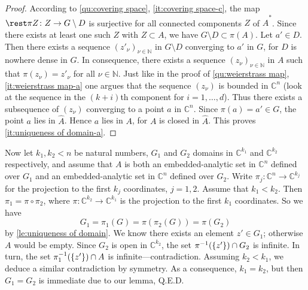 \documentclass[a4paper]{amsart}
\newcommand{\N}{\mathbb{N}}
\newcommand{\C}{\mathbb{C}}
\theoremstyle{remark}
\numberwithin{equation}{question}
\DeclarePairedDelimiter\set{\{}{\}}
\begin{document}
\begin{solution}
\begin{proof}
According to \cref{qu:covering space}, \cref{it:covering space-c}, the map $\rest\pi Z \colon Z \to G \setminus D$ is surjective for all connected components $Z$ of $\hat A^*$. Since there exists at least one such $Z$ with $Z \subset A$, we have $G \setminus D \subset \pi(A)$. Let $a' \in D$. Then there exists a sequence $(z'_\nu)_{\nu \in \N}$ in $G \setminus D$ converging to $a'$ in $G$, for $D$ is nowhere dense in $G$. In consequence, there exists a sequence $(z_\nu)_{\nu \in \N}$ in $A$ such that $\pi(z_\nu) = z'_\nu$ for all $\nu \in \N$. Just like in the proof of \cref{qu:weierstrass map}, \cref{it:weierstrass map-a} one argues that the sequence $(z_\nu)$ is bounded in $\C^n$ (look at the sequence in the $(k+i)$th component for $i = 1,\dots,d$). Thus there exists a subsequence of $(z_\nu)$ converging to a point $a$ in $\C^n$. Since $\pi(a) = a' \in G$, the point $a$ lies in $\hat A$. Hence $a$ lies in $A$, for $A$ is closed in $\hat A$. This proves \cref{it:uniqueness of domain-a}.
\end{proof}

Now let $k_1,k_2 < n$ be natural numbers, $G_1$ and $G_2$ domains in $\C^{k_1}$ and $\C^{k_2}$ respectively, and assume that $A$ is both an embedded-analytic set in $\C^n$ defined over $G_1$ and an embedded-analytic set in $\C^n$ defined over $G_2$. Write $\pi_j \colon \C^n \to \C^{k_j}$ for the projection to the first $k_j$ coordinates, $j=1,2$. Assume that $k_1 < k_2$. Then $\pi_1 = \pi \circ \pi_2$, where $\pi \colon \C^{k_2} \to \C^{k_1}$ is the projection to the first $k_1$ coordinates. So we have
\[
G_1 = \pi_1(G) = \pi(\pi_2(G)) = \pi(G_2)
\]
by \cref{le:uniqueness of domain}. We know there exists an element $z' \in G_1$; otherwise $A$ would be empty. Since $G_2$ is open in $\C^{k_2}$, the set $\pi^{-1}(\set{z'}) \cap G_2$ is infinite. In turn, the set $\pi_1^{-1}(\set{z'}) \cap A$ is infinite---contradiction. Assuming $k_2 < k_1$, we deduce a similar contradiction by symmetry. As a consequence, $k_1 = k_2$, but then $G_1 = G_2$ is immediate due to our lemma, Q.E.D.
\end{solution}
\end{document}
